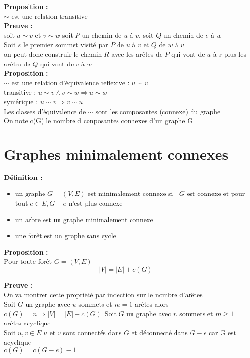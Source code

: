 \documentclass{report}
\newcommand{\deffinition}{\textcolor[rgb]{0.65,0,0.7}{Définition : }}
\newcommand{\Def}{\textbf{\deffinition}}
\newcommand{\preuve}{\textcolor[rgb]{0.95,0.25,0}{Preuve : }}
\newcommand{\Preuve}{\textbf{\preuve}}
\newcommand{\propo}{\textcolor[rgb]{0,0,0.75}{Proposition : }}
\newcommand{\Propo}{\textbf{\propo}}
\begin{document}
\Propo\\
$\sim $ est une relation transitive\\

\Preuve\\
soit $u \sim v$ et $v \sim w$ soit $P$ un chemin de $u$ à $v$, soit $Q$ un chemin de $v$ à $w$ \\
Soit $s$ le premier sommet visité par $P$ de $u$ à $v$ et $Q$ de $w$ à $v$\\
on peut donc construir le chemin $R$ avec les arêtes de $P$ qui vont de $u$ à $s$ plus les arêtes de $Q$ qui vont de $s$ à $w$\\
\newpage
\Propo\\
$\sim$ est une relation d'équivalence
reflexive : $u \sim u$\\
transitive : $u \sim v \wedge v \sim w\Rightarrow u \sim w$\\
symérique : $u \sim v\Rightarrow v \sim u$\\

Les classes d'équivalence de $\sim$ sont les composantes (connexe) du graphe\\
On note c(G) le nombre d conposantes connexes d'un graphe G\\

\section{Graphes minimalement connexes}
\Def\\
\begin{itemize}
	\item un graphe $G=(V,E)$ est minimalement connexe si , $G$ est connexe et pour tout $e \in E,G-e$ n'est plus connexe
	\item un arbre est un graphe minimalement connexe
	\item une forêt est un graphe sans cycle\\
\end{itemize}

\Propo\\
Pour toute forêt $G=(V,E)$\\
$$\left|V\right|=\left|E\right|+c(G)$$

\Preuve\\
On va montrer cette propriété par indection sur le nombre d'arêtes\\
Soit $G$ un graphe avec $n$ sommets et $m=0$ arêtes alors $c(G) =n \Rightarrow \left|V\right|=\left|E\right|+c(G)$\
Soit $G$ un graphe avec $n$ sommets et $m\geq1$arêtes acyclique\\
Soit $u,v \in E$ $u$ et $v$ sont connectés dans $G$ et déconnecté dans $G-e$ car G est acyclique \\
$c(G) = c(G-e)-1$\\
\end{document}
